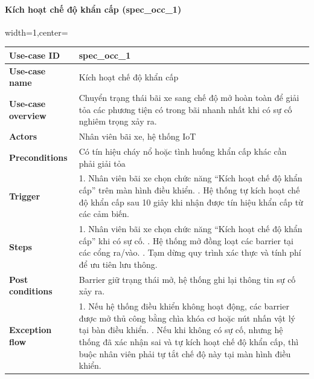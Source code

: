 \paragraph{Kích hoạt chế độ khẩn cấp (spec\_occ\_1)}
\begin{adjustbox}{width=1\textwidth,center=\textwidth}
\small
\begin{tabular}{|>{\centering\arraybackslash}m{3.5cm}|m{13.2cm}|}
\hline
\textbf{Use-case ID} & spec\_occ\_1   \\ \hline
\textbf{Use-case name} & Kích hoạt chế độ khẩn cấp   \\ \hline
\textbf{Use-case overview} & Chuyển trạng thái bãi xe sang chế độ mở hoàn toàn để giải tỏa các phương tiện có trong bãi nhanh nhất khi có sự cố nghiêm trọng xảy ra. \\ \hline
\textbf{Actors} & Nhân viên bãi xe, hệ thống IoT   \\ \hline
\textbf{Preconditions} & Có tín hiệu cháy nổ hoặc tình huống khẩn cấp khác cần phải giải tỏa   \\ \hline
\textbf{Trigger} & 1. Nhân viên bãi xe chọn chức năng “Kích hoạt chế độ khẩn cấp” trên màn hình điều khiển. \newline 2. Hệ thống tự kích hoạt chế độ khẩn cấp sau 10 giây khi nhận được tín hiệu khẩn cấp từ các cảm biến. \\ \hline
\textbf{Steps} & 
1. Nhân viên bãi xe chọn chức năng “Kích hoạt chế độ khẩn cấp” khi có sự cố. \newline
2. Hệ thống mở đồng loạt các barrier tại các cổng ra/vào. \newline
3. Tạm dừng quy trình xác thực và tính phí để ưu tiên lưu thông. \\ \hline
\textbf{Post conditions} & Barrier giữ trạng thái mở, hệ thống ghi lại thông tin sự cố xảy ra. \\ \hline
\textbf{Exception flow} & 1. Nếu hệ thống điều khiển không hoạt động, các barrier được mở thủ công bằng chìa khóa cơ hoặc nút nhấn vật lý tại bàn điều khiển. \newline
2. Nếu khi không có sự cố, nhưng hệ thống đã xác nhận sai và tự kích hoạt chế độ khẩn cấp, thì buộc nhân viên phải tự tắt chế độ này tại màn hình điều khiển. \\ \hline
\end{tabular}
\end{adjustbox}

